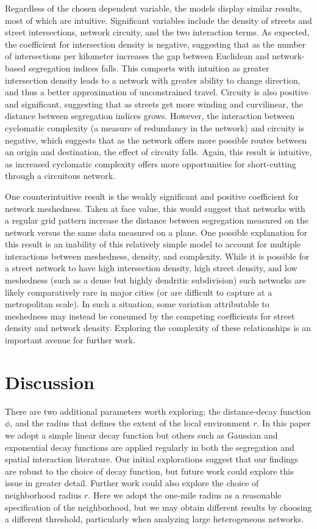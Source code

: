 \documentclass[
  10pt,
]{article}
\begin{document}
Regardless of the chosen dependent variable, the models display similar
results, most of which are intuitive. Significant variables include the
density of streets and street intersections, network circuity, and the
two interaction terms. As expected, the coefficient for intersection
density is negative, suggesting that as the number of intersections per
kilometer increases the gap between Euclidean and network-based
segregation indices falls. This comports with intuition as greater
intersection density leads to a network with greater ability to change
direction, and thus a better approximation of unconstrained travel.
Circuity is also positive and significant, suggesting that as streets
get more winding and curvilinear, the distance between segregation
indices grows. However, the interaction between cyclomatic complexity (a
measure of redundancy in the network) and circuity is negative, which
suggests that as the network offers more possible routes between an
origin and destination, the effect of circuity falls. Again, this result
is intuitive, as increased cyclomatic complexity offers more
opportunities for short-cutting through a circuitous network.

One counterintuitive result is the weakly significant and positive
coefficient for network meshedness. Taken at face value, this would
suggest that networks with a regular grid pattern increase the distance
between segregation measured on the network versus the same data
measured on a plane. One possible explanation for this result is an
inability of this relatively simple model to account for multiple
interactions between meshedness, density, and complexity. While it is
possible for a street network to have high intersection density, high
street density, and low meshedness (such as a dense but highly dendritic
subdivision) such networks are likely comparatively rare in major cities
(or are difficult to capture at a metropolitan scale). In such a
situation, some variation attributable to meshedness may instead be
consumed by the competing coefficients for street density and network
density. Exploring the complexity of these relationships is an important
avenue for further work.

\hypertarget{discussion}{%
\section{Discussion}\label{discussion}}

There are two additional parameters worth exploring: the distance-decay
function \(\phi\), and the radius that defines the extent of the local
environment \(r\). In this paper we adopt a simple linear decay function
but others such as Gaussian and exponential decay functions are applied
regularly in both the segregation and spatial interaction literature.
Our initial explorations suggest that our findings are robust to the
choice of decay function, but future work could explore this issue in
greater detail. Further work could also explore the choice of
neighborhood radius \(r\). Here we adopt the one-mile radius as a
reasonable specification of the neighborhood, but we may obtain
different results by choosing a different threshold, particularly when
analyzing large heterogeneous networks.
\end{document}
